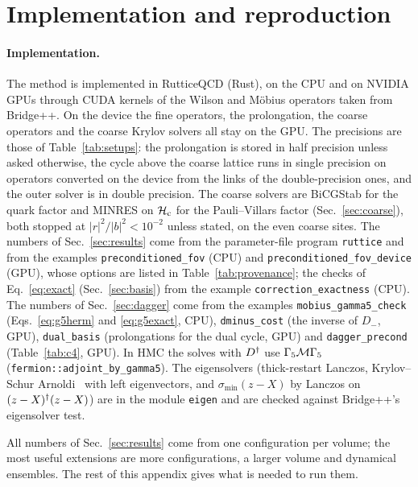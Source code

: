 
\section{Implementation and reproduction}
\label{sec:impl}\label{sec:reproduce}
\begingroup\sloppy

\paragraph{Implementation.} The method is implemented in RutticeQCD (Rust), on
the CPU and on NVIDIA GPUs through CUDA kernels of the Wilson and M\"obius
operators taken from Bridge++. On the device the fine operators, the
prolongation, the coarse operators and the coarse Krylov solvers all stay on the
GPU. The precisions are those of Table~\ref{tab:setups}: the prolongation is stored
in half precision unless asked otherwise, the cycle above the coarse lattice runs in
single precision on operators converted on the device from the links of the
double-precision ones, and the outer solver is in double precision. The coarse
solvers are BiCGStab for the quark factor and MINRES on $\mathcal H_{\mathrm c}$ for the Pauli--Villars
factor (Sec.~\ref{sec:coarse}), both stopped at $|r|^2/|b|^2<10^{-2}$ unless stated,
on the even coarse sites. The numbers of Sec.~\ref{sec:results} come from the
parameter-file program \texttt{ruttice} and from the examples
\texttt{preconditioned\_fov} (CPU) and \texttt{preconditioned\_fov\_device} (GPU),
whose options are listed in Table~\ref{tab:provenance}; the checks of
Eq.~\eqref{eq:exact} (Sec.~\ref{sec:basis}) from the example \texttt{correction\_exactness} (CPU). The
numbers of Sec.~\ref{sec:dagger} come from the examples \texttt{mobius\_gamma5\_check}
(Eqs.~\eqref{eq:g5herm} and \eqref{eq:g5exact}, CPU), \texttt{dminus\_cost} (the inverse of
$D_-$, GPU), \texttt{dual\_basis} (prolongations for the dual cycle, GPU) and
\texttt{dagger\_precond} (Table~\ref{tab:c4}, GPU). In HMC the solves with $D^{\dagger}$ use
$\Gamma_5\mathcal M\Gamma_5$ (\texttt{fermion::adjoint\_by\_gamma5}).
The eigensolvers (thick-restart Lanczos, Krylov--Schur Arnoldi~\cite{Stewart} with
left eigenvectors, and $\sigma_{\min}(z-X)$ by Lanczos on $(z-X)^{\dagger}(z-X)$) are in the
module \texttt{eigen} and are checked against Bridge++'s eigensolver test.

All numbers of Sec.~\ref{sec:results} come from one configuration per volume; the
most useful extensions are more configurations, a larger volume and dynamical
ensembles. The rest of this appendix gives what is needed to run them.

